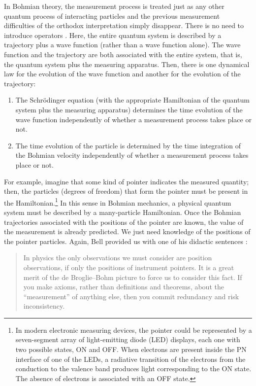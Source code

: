\documentclass[onecolumn,nofootinbib, secnumarabic, amsmath, nobibnotes,11pt,aps,pra]{revtex4-1}
\begin{document}
In Bohmian theory, the measurement process is treated just as any
other quantum process of interacting particles and the previous
measurement difficulties of the orthodox interpretation simply
disappear. There is no need to introduce operators
\cite{om.Durrnaive,om.Durrllibre,om.goldstein}. Here, the entire
quantum system is described by a trajectory plus a wave function
(rather than a wave function alone). The wave function and the
trajectory are both associated with the entire system, that is, the
quantum system plus the measuring apparatus. Then, there is one dynamical law for
the evolution of the wave function and another  for the
evolution of the trajectory:\enlargethispage{1pc}
\begin{enumerate}
\item The Schr\"odinger equation (with the appropriate Hamiltonian of the quantum system plus the measuring apparatus) determines the time evolution of the wave function independently of whether a measurement process takes place or not.

\item The time evolution of the particle is determined by the time integration of the Bohmian velocity independently of whether a measurement process takes place or not.
\end{enumerate}

For example, imagine that some kind of pointer indicates the
measured quantity; then, the particles (degrees of freedom) that
form the pointer must be present in the Hamiltonian.\footnote{In
modern electronic measuring devices, the pointer could be
represented by a seven-segment array of light-emitting diode (LED)
displays, each one with two possible states, ON and OFF. When
electrons are present inside the PN interface of one of the LEDs, a
radiative transition of the electrons from the conduction to the
valence band produces light corresponding to the ON state. The
absence of electrons is associated with an OFF state.} In this
sense in Bohmian mechanics,  a physical quantum system must be described by a
many-particle Hamiltonian. Once the Bohmian
trajectories associated with the positions of the pointer are known,
the value of the measurement is already predicted. We just need
knowledge of the positions of the pointer particles. Again, Bell
provided us with one of his didactic sentences \cite{om.Bell1987}:
\begin{quote}
In physics the only observations we must consider are position
observations, if only the positions of instrument pointers. It is a
great merit of the de Broglie--Bohm picture to force us to consider
this fact. If you make axioms, rather than definitions and theorems,
about the ``measurement'' of anything else, then you commit
redundancy and risk inconsistency.\enlargethispage{1pc}
\end{quote}
\end{document}
